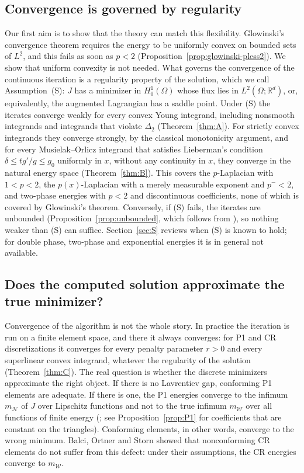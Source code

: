 \documentclass[11pt]{amsart}
\theoremstyle{definition}
\theoremstyle{remark}
\numberwithin{equation}{section}
\newcommand{\R}{\mathbb{R}}
\newcommand{\mW}{m_{\mathcal W}}
\newcommand{\mH}{m_{\mathcal H}}
\begin{document}
\subsection*{Convergence is governed by regularity}
Our first aim is to show that the theory can match this flexibility. Glowinski's convergence theorem requires the energy to be uniformly convex on bounded sets of $L^2$, and this fails as soon as $p<2$ (Proposition~\ref{prop:glowinski-pless2}). We show that uniform convexity is not needed. What governs the convergence of the continuous iteration is a regularity property of the solution, which we call Assumption~(S): $J$ has a minimizer in $H^1_0(\Omega)$ whose flux lies in $L^2(\Omega;\R^d)$, or, equivalently, the augmented Lagrangian has a saddle point. Under (S) the iterates converge weakly for every convex Young integrand, including nonsmooth integrands and integrands that violate $\Delta_2$ (Theorem~\ref{thm:A}). For strictly convex integrands they converge strongly, by the classical monotonicity argument, and for every Musielak--Orlicz integrand that satisfies Lieberman's condition $\delta\le tg'/g\le g_0$ uniformly in $x$, without any continuity in $x$, they converge in the natural energy space (Theorem~\ref{thm:B}). This covers the $p$-Laplacian with $1<p<2$, the $p(x)$-Laplacian with a merely measurable exponent and $p^-<2$, and two-phase energies with $p<2$ and discontinuous coefficients, none of which is covered by Glowinski's theorem. Conversely, if (S) fails, the iterates are unbounded (Proposition~\ref{prop:unbounded}, which follows from \cite[Thm.~7]{EcksteinBertsekas1992}), so nothing weaker than (S) can suffice. Section~\ref{sec:S} reviews when (S) is known to hold; for double phase, two-phase and exponential energies it is in general not available.

\subsection*{Does the computed solution approximate the true minimizer?}
Convergence of the algorithm is not the whole story. In practice the iteration is run on a finite element space, and there it always converges: for P1 and CR discretizations it converges for every penalty parameter $r>0$ and every superlinear convex integrand, whatever the regularity of the solution (Theorem~\ref{thm:C}). The real question is whether the discrete minimizers approximate the right object. If there is no Lavrentiev gap, conforming P1 elements are adequate. If there is one, the P1 energies converge to the infimum $\mH$ of $J$ over Lipschitz functions and not to the true infimum $\mW$ over all functions of finite energy (\cite{CarstensenOrtner2010}; see Proposition~\ref{prop:P1} for coefficients that are constant on the triangles). Conforming elements, in other words, converge to the wrong minimum. Balci, Ortner and Storn \cite{BalciOrtnerStorn2022} showed that nonconforming CR elements do not suffer from this defect: under their assumptions, the CR energies converge to $\mW$.
\end{document}
